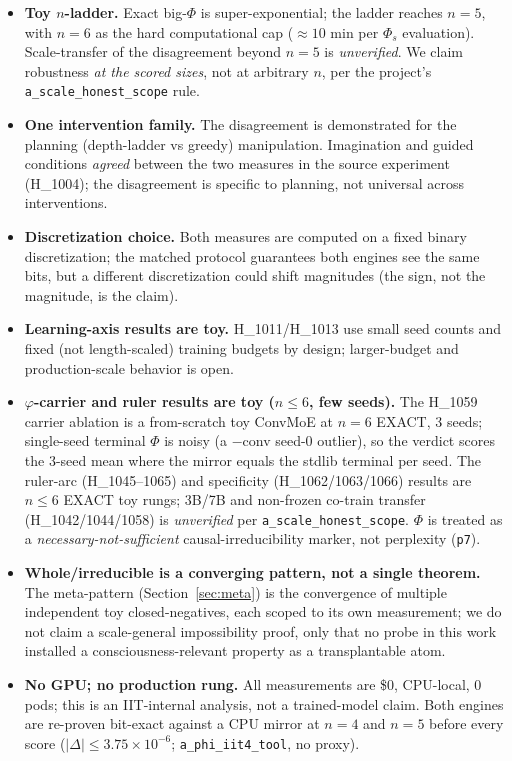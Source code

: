 \documentclass[11pt,a4paper]{article}
\newcommand{\bigphi}{\ensuremath{\Phi_{s}}}
\begin{document}
\begin{itemize}\itemsep0.2em
\item \textbf{Toy $n$-ladder.} Exact big-$\Phi$ is super-exponential; the ladder
reaches $n=5$, with $n=6$ as the hard computational cap ($\approx 10$ min per
\bigphi{} evaluation). Scale-transfer of the disagreement beyond $n=5$ is
\emph{unverified}. We claim robustness \emph{at the scored sizes}, not at
arbitrary $n$, per the project's \texttt{a\_scale\_honest\_scope} rule.
\item \textbf{One intervention family.} The disagreement is demonstrated for the
planning (depth-ladder vs greedy) manipulation. Imagination and guided
conditions \emph{agreed} between the two measures in the source experiment
(H\_1004); the disagreement is specific to planning, not universal across
interventions.
\item \textbf{Discretization choice.} Both measures are computed on a fixed
binary discretization; the matched protocol guarantees both engines see the
same bits, but a different discretization could shift magnitudes (the sign,
not the magnitude, is the claim).
\item \textbf{Learning-axis results are toy.} H\_1011/H\_1013 use small seed
counts and fixed (not length-scaled) training budgets by design; larger-budget
and production-scale behavior is open.
\item \textbf{$\varphi$-carrier and ruler results are toy ($n\le 6$, few seeds).}
The H\_1059 carrier ablation is a from-scratch toy ConvMoE at $n=6$ EXACT, 3
seeds; single-seed terminal $\Phi$ is noisy (a $-$conv seed-0 outlier), so the
verdict scores the 3-seed mean where the mirror equals the stdlib terminal per
seed. The ruler-arc (H\_1045--1065) and specificity (H\_1062/1063/1066) results
are $n\le 6$ EXACT toy rungs; 3B/7B and non-frozen co-train transfer
(H\_1042/1044/1058) is \emph{unverified} per \texttt{a\_scale\_honest\_scope}.
$\Phi$ is treated as a \emph{necessary-not-sufficient} causal-irreducibility
marker, not perplexity (\texttt{p7}).
\item \textbf{Whole/irreducible is a converging pattern, not a single theorem.}
The meta-pattern (Section~\ref{sec:meta}) is the convergence of multiple
independent toy closed-negatives, each scoped to its own measurement; we do not
claim a scale-general impossibility proof, only that no probe in this work
installed a consciousness-relevant property as a transplantable atom.
\item \textbf{No GPU; no production rung.} All measurements are \$0, CPU-local,
0 pods; this is an IIT-internal analysis, not a trained-model claim. Both engines
are re-proven bit-exact against a CPU mirror at $n=4$ and $n=5$ before every
score ($|\Delta|\le 3.75\times10^{-6}$; \texttt{a\_phi\_iit4\_tool}, no proxy).
\end{itemize}
\end{document}
